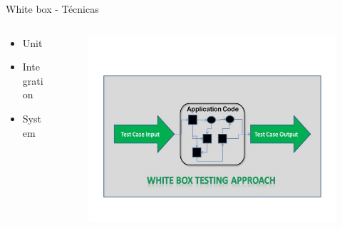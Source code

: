 \documentclass{beamer}
\begin{document}
\begin{frame}{White box - Técnicas}
\begin{columns}[T]
\begin{column}[T]{4cm}
\begin{itemize}
\item Unit
\item Integration
\item System

\end{itemize}
\end{column}
\begin{column}[T]{6cm} %
\begin{figure}
\centering
\includegraphics[width=\linewidth]{Images/whiteboxtesting.jpg}
\end{figure}
\end{column}
\end{columns}
\end{frame}
\end{document}
